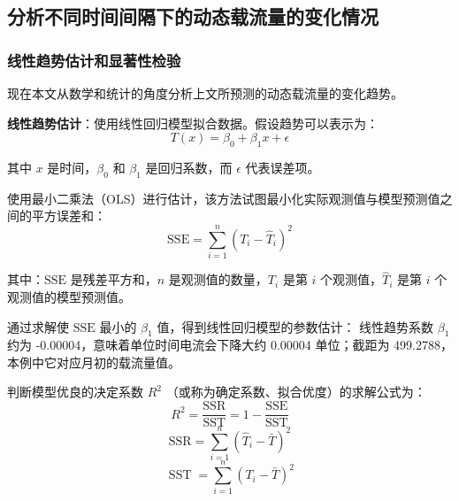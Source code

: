 \documentclass[withoutpreface,bwprint]{cumcmthesis}  %
\begin{document}
        \subsection {分析不同时间间隔下的动态载流量的变化情况}
        
        \subsubsection{线性趋势估计和显著性检验}
            现在本文从数学和统计的角度分析上文所预测的动态载流量的变化趋势。

            \vspace{12pt}

            \textbf{线性趋势估计}：使用线性回归模型拟合数据。假设趋势可以表示为：
                \begin{equation}
		          T(x)=\beta_0+\beta_1 x+\epsilon
	        \end{equation}
                
                其中 $x$ 是时间，$\beta_0$ 和 $\beta_1$ 是回归系数，而 $\epsilon$ 代表误差项。
                                 
                使用最小二乘法（OLS）进行估计，该方法试图最小化实际观测值与模型预测值之间的平方误差和：
                \begin{equation}
                    \text{SSE} = \sum_{i=1}^{n} (T_i - \hat{T}_i)^2
                \end{equation}
                
                其中：$\text{SSE}$ 是残差平方和，$n$ 是观测值的数量，$T_i$ 是第 $i$ 个观测值，$\hat{T}_i$ 是第 $i$ 个观测值的模型预测值。

                通过求解使 $\text{SSE}$ 最小的 $\beta_1$ 值，得到线性回归模型的参数估计：
                线性趋势系数 $\beta_1$ 约为 -0.00004，意味着单位时间电流会下降大约 0.00004 单位；截距为 499.2788，本例中它对应月初的载流量值。
                
                判断模型优良的决定系数 $R^2$ （或称为确定系数、拟合优度）的求解公式为：
                \begin{equation}
                    R^2=\frac{\mathrm{SSR}}{\mathrm{SST}}=1-\frac{\mathrm{SSE}}{\mathrm{SST}}
                    \label{R2}
                \end{equation}
                \begin{equation}
                    \mathrm{SSR}=\sum_{i=1}^n\left(\hat{T}_i-\bar{T}\right)^2
                \end{equation}                
                \begin{equation}
                    \operatorname{SST}=\sum_{i=1}^n\left(T_i-\bar{T}\right)^2
                \end{equation}
\end{document}
